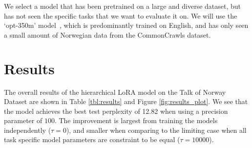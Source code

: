 \documentclass[fullpaper]{nldl}
\begin{document}
We select a model that has been pretrained on a large and diverse dataset, but has not seen the specific tasks that we want to evaluate it on. We will use the `opt-350m' model~\cite{zhang_opt_2022}, which is predominantly trained on English, and has only seen a small amount of Norwegian data from the CommonCrawls dataset.

\section{Results} \label{sec:results}
The overall results of the hierarchical LoRA model on the Talk of Norway Dataset are shown in Table \ref{tbl:results} and Figure \ref{fig:results_plot}. We see that the model achieves the best test perplexity of 12.82 when using a precision parameter of $100$. The improvement is largest from training the models independently ($\tau = 0$), and smaller when comparing to the limiting case when all task specific model parameters are constraint to be equal ($\tau=10000$).

\begin{table}[ht] 
    \centering
        \caption{Empirical results of the hierarchical LORA finetuned on the three tasks. The perplexity is calculated on the test set.}
        \label{tbl:results}
    \end{table}
\end{document}
